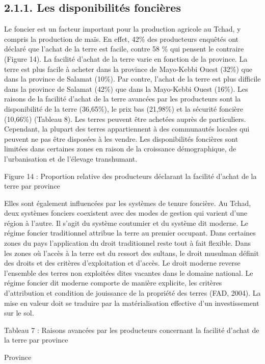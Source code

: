 \documentclass[12pt,oneside]{report}
\begin{document}
\subsection{2.1.1. Les disponibilités foncières}
Le foncier est un facteur important pour la production agricole au Tchad, y compris la production de maïs. En effet, 42\% des producteurs enquêtés ont déclaré que l’achat de la terre est facile, contre 58 \% qui pensent le contraire (Figure 14). La facilité d’achat de la terre varie en fonction de la province. La terre est plus facile à acheter dans la province de Mayo-Kebbi Ouest (32\%) que dans la province de Salamat (10\%). Par contre, l’achat de la terre est plus difficile dans la province de Salamat (42\%) que dans la Mayo-Kebbi Ouest (16\%). Les raisons de la facilité d’achat de la terre avancées par les producteurs sont la disponibilité de la terre (36,65\%), le prix bas (21,98\%) et la sécurité foncière (10,66\%) (Tableau 8). Les terres peuvent être achetées auprès de particuliers. Cependant, la plupart des terres appartiennent à des communautés locales qui peuvent ne pas être disposées à les vendre. Les disponibilités foncières sont limitées dans certaines zones en raison de la croissance démographique, de l'urbanisation et de l'élevage transhumant.

Figure 14 : Proportion relative des producteurs déclarant la facilité d’achat de la terre par province

Elles sont également influencées par les systèmes de tenure foncière. Au Tchad, deux systèmes fonciers coexistent avec des modes de gestion qui varient d'une région à l'autre. Il s'agit du système coutumier et du système dit moderne. Le régime foncier traditionnel attribue la terre au premier occupant. Dans certaines zones du pays l’application du droit traditionnel reste tout à fait flexible. Dans les zones où l’accès à la terre est du ressort des sultans, le droit musulman définit des droits et des critères d’exploitation et d’accès. Le droit moderne reverse l’ensemble des terres non exploitées dites vacantes dans le domaine national. Le régime foncier dit moderne comporte de manière explicite, les critères d’attribution et condition de jouissance de la propriété des terres (FAD, 2004). La mise en valeur doit se traduire par la matérialisation effective d’un investissement sur le sol.

Tableau 7 : Raisons avancées par les producteurs concernant la facilité d’achat de la terre par province

Province
\end{document}

